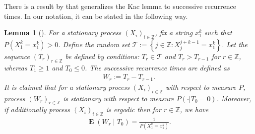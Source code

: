 \documentclass[a4paper]{article}
\newcommand{\okra}[1]{\left( #1 \right)}
\newcommand{\klam}[1]{\left\{ #1 \right\}}
\DeclareMathOperator{\mean}{\mathbf{E}}
\newtheorem{lemma}{Lemma}
\begin{document}
There is a result by \citeauthor{ChenMoy59} that generalizes the Kac
lemma to successive recurrence times. In our notation, it can be
stated in the following way.
\begin{lemma}[\citep{ChenMoy59}]
  \label{theoChenMoy}
  For a stationary process $(X_i)_{i\in\mathbb{Z}}$, fix a string
  $x_1^k$ such that $P(X_1^k=x_1^k)>0$. Define the random set
  $\mathcal{T}:=\klam{j\in\mathbb{Z}: X_{j}^{j+k-1}=x_1^k}$.  Let the
  sequence $(T_r)_{r\in\mathbb{Z}}$ be defined by conditions:
  $T_r\in\mathcal{T}$ and $T_r>T_{r-1}$ for $r\in\mathbb{Z}$, whereas
  $T_1\ge 1$ and $T_0\le 0$. The successive recurrence times are
  defined as
  \begin{align}
    \label{Successive}
    W_r:=T_r-T_{r-1}.
  \end{align}
  It is claimed that for a stationary process $(X_i)_{i\in\mathbb{Z}}$
  with respect to measure $P$, process $(W_r)_{r\in\mathbb{Z}}$ is
  stationary with respect to measure $P(\cdot|T_0=0)$. Moreover, if
  additionally process $(X_i)_{i\in\mathbb{Z}}$ is ergodic then for
  $r\in\mathbb{Z}$, we have
  \begin{align}
    \mean\okra{W_r\middle|T_0}
    =
    \frac{1}{P(X_1^k=x_1^k)}.
  \end{align}
\end{lemma}
\end{document}
